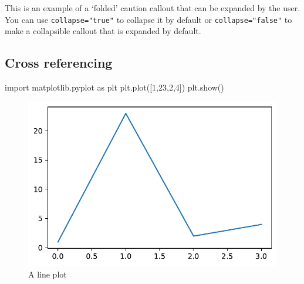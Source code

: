 \documentclass[
  letterpaper,
  DIV=11,
  numbers=noendperiod,
  oneside]{scrartcl}
\newenvironment{Shaded}{\begin{snugshade}}{\end{snugshade}}
\newcommand{\DecValTok}[1]{\textcolor[rgb]{0.68,0.00,0.00}{#1}}
\newcommand{\ImportTok}[1]{\textcolor[rgb]{0.00,0.46,0.62}{#1}}
\newcommand{\NormalTok}[1]{\textcolor[rgb]{0.00,0.23,0.31}{#1}}
\begin{document}
\begin{tcolorbox}[enhanced jigsaw, colframe=quarto-callout-caution-color-frame, left=2mm, bottomtitle=1mm, bottomrule=.15mm, coltitle=black, colbacktitle=quarto-callout-caution-color!10!white, leftrule=.75mm, toprule=.15mm, colback=white, rightrule=.15mm, toptitle=1mm, opacityback=0, titlerule=0mm, title=\textcolor{quarto-callout-caution-color}{\faFire}\hspace{0.5em}{Expand To Learn About Collapse}, breakable, opacitybacktitle=0.6, arc=.35mm]

This is an example of a `folded' caution callout that can be expanded by
the user. You can use \texttt{collapse="true"} to collapse it by default
or \texttt{collapse="false"} to make a collapsible callout that is
expanded by default.

\end{tcolorbox}

\hypertarget{cross-referencing}{%
\subsection{Cross referencing}\label{cross-referencing}}

\begin{Shaded}
\begin{Highlighting}[]
\ImportTok{import}\NormalTok{ matplotlib.pyplot }\ImportTok{as}\NormalTok{ plt}
\NormalTok{plt.plot([}\DecValTok{1}\NormalTok{,}\DecValTok{23}\NormalTok{,}\DecValTok{2}\NormalTok{,}\DecValTok{4}\NormalTok{])}
\NormalTok{plt.show()}
\end{Highlighting}
\end{Shaded}

\begin{figure}[H]

{\centering \includegraphics{start-with-quarto_files/figure-pdf/fig-line-plot-output-1.pdf}

}

\caption{\label{fig-line-plot}A line plot}

\end{figure}
\end{document}
